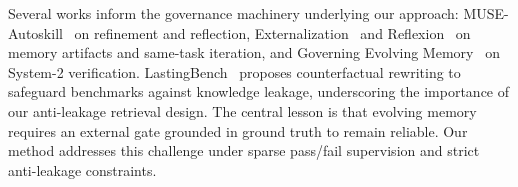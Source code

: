 Several works inform the governance machinery underlying our approach: MUSE-Autoskill~\cite{lin2026muse} on refinement and reflection, Externalization~\cite{zhou2026externalization} and Reflexion~\cite{shinn2023reflexion} on memory artifacts and same-task iteration, and Governing Evolving Memory~\cite{lam2026governing} on System-2 verification. LastingBench~\cite{fang2025lastingbench} proposes counterfactual rewriting to safeguard benchmarks against knowledge leakage, underscoring the importance of our anti-leakage retrieval design. The central lesson is that evolving memory requires an external gate grounded in ground truth to remain reliable. Our method addresses this challenge under sparse pass/fail supervision and strict anti-leakage constraints.
